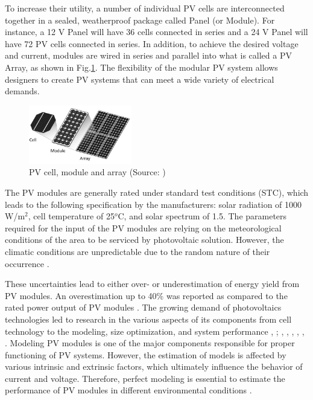 \documentclass[journal]{IEEEtran}
\begin{document}
To increase their utility, a number of individual PV cells are interconnected together in a sealed, weatherproof package called Panel (or Module). For instance, a 12 V Panel will have 36 cells connected in series and a 24 V Panel will have 72 PV cells connected in series. In addition, to achieve the desired voltage and current, modules are wired in series and parallel into what is called a PV Array, as shown in Fig.\ref{fig:celmodarray}. The flexibility of the modular PV system allows designers to create PV systems that can meet a wide variety of electrical demands. 

\begin{figure}[h]
\includegraphics[width=0.4\textwidth]{celmodarray}
\centering
\caption{PV cell, module and array (Source: \cite{SamlexSolar})}
\label{fig:celmodarray}
\end{figure}

The PV modules are generally rated under standard test conditions (STC), which leads to the following specification by the manufacturers:  solar radiation of 1000 W/m$^{2}$, cell temperature of 25$^{o}$C, and solar spectrum of 1.5. The parameters required for the input of the PV modules are relying on the meteorological conditions of the area to be serviced by photovoltaic solution. However, the climatic conditions are unpredictable due to the random nature of their occurrence \cite{Jakhrani}.
 
These uncertainties lead to either over- or underestimation of energy yield from PV modules. An overestimation up to 40\% was reported as compared to the rated power output of PV modules \cite{Durisch}. The growing demand of photovoltaics technologies led to research in the various aspects of its components from cell technology to the modeling, size optimization, and system performance \cite{Rajanna}, \cite{Badejani}; \cite{Yatimi}, \cite{Ferrari}, \cite{Saloux}, \cite{Hasan}, \cite{King}, \cite{Mellit}. Modeling PV modules is one of the major components responsible for proper functioning of PV systems. However, the estimation of models is affected by various intrinsic and extrinsic factors, which ultimately influence the behavior of current and voltage. Therefore, perfect modeling is essential to estimate the performance of PV modules in different environmental conditions \cite{Jakhrani}.
 
\end{document}
